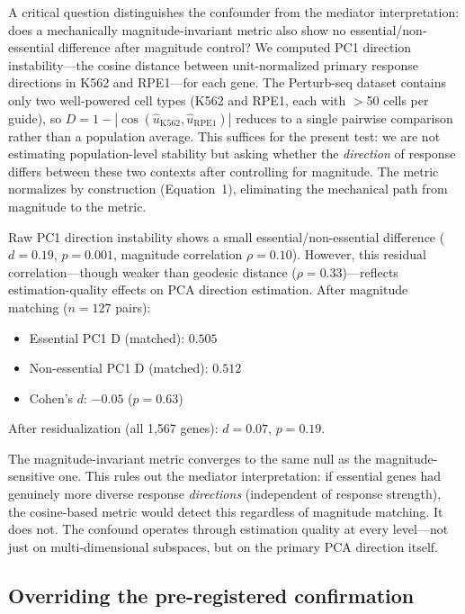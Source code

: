 \documentclass[11pt]{article}
\begin{document}
A critical question distinguishes the confounder from the mediator
interpretation: does a mechanically magnitude-invariant metric also show
no essential/non-essential difference after magnitude control? We
computed PC1 direction instability---the cosine distance between
unit-normalized primary response directions in K562 and RPE1---for each
gene. The Perturb-seq dataset contains only two well-powered cell types
(K562 and RPE1, each with $>$50 cells per guide), so $D = 1 -
|\cos(\hat{u}_{\text{K562}}, \hat{u}_{\text{RPE1}})|$ reduces to a
single pairwise comparison rather than a population average. This
suffices for the present test: we are not estimating population-level
stability but asking whether the \emph{direction} of response differs
between these two contexts after controlling for magnitude. The metric
normalizes by construction (Equation~1), eliminating the mechanical path
from magnitude to the metric.

Raw PC1 direction instability shows a small essential/non-essential
difference ($d = 0.19$, $p = 0.001$, magnitude correlation $\rho =
0.10$). However, this residual correlation---though weaker than geodesic
distance ($\rho = 0.33$)---reflects estimation-quality effects on PCA
direction estimation. After magnitude matching ($n = 127$ pairs):

\begin{itemize}
  \item Essential PC1 D (matched): $0.505$
  \item Non-essential PC1 D (matched): $0.512$
  \item Cohen's $d$: $-0.05$ ($p = 0.63$)
\end{itemize}

After residualization (all 1{,}567 genes): $d = 0.07$, $p = 0.19$.

The magnitude-invariant metric converges to the same null as the
magnitude-sensitive one. This rules out the mediator interpretation: if
essential genes had genuinely more diverse response \emph{directions}
(independent of response strength), the cosine-based metric would detect
this regardless of magnitude matching. It does not. The confound
operates through estimation quality at every level---not just on
multi-dimensional subspaces, but on the primary PCA direction itself.

\subsection{Overriding the pre-registered confirmation}
\end{document}
